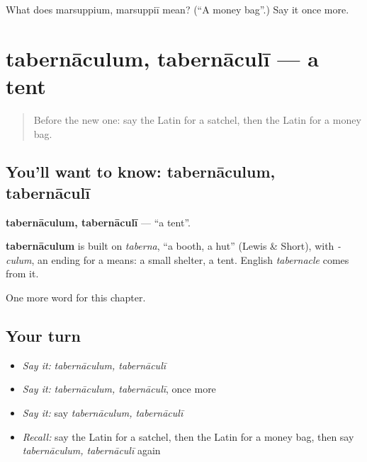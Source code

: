 \begin{tcolorbox}[breakable,colback=teal!4,colframe=teal!35!black,title={Before you move on}]
What does marsuppium, marsuppiī mean? (\textquotedblleft{}A money bag\textquotedblright{}.) Say it once more.
\end{tcolorbox}
\section[tabernāculum, tabernāculī]{tabernāculum, tabernāculī — a tent}

\label{lesson:LA-C254-tabernaculum}



\begin{quote}
Before the new one: say the Latin for a satchel, then the Latin for a money bag.
\end{quote}

\subsection*{You'll want to know: tabernāculum, tabernāculī}
\textbf{tabernāculum, tabernāculī} — \textquotedblleft{}a tent\textquotedblright{}.

\begin{cousinweb}
\textbf{tabernāculum} is built on \emph{taberna}, \textquotedblleft{}a booth, a hut\textquotedblright{} (Lewis \& Short), with \emph{-culum}, an ending for a means: a small shelter, a tent. English \emph{tabernacle} comes from it.
\end{cousinweb}

\begin{grammarlens}[title={What you've built}]
One more word for this chapter.
\end{grammarlens}

\subsection*{Your turn}
\begin{itemize}
\raggedright
  \item \emph{Say it:} \emph{tabernāculum, tabernāculī}
  \item \emph{Say it:} \emph{tabernāculum, tabernāculī}, once more
  \item \emph{Say it:} say \emph{tabernāculum, tabernāculī}
  \item \emph{Recall:} say the Latin for a satchel, then the Latin for a money bag, then say \emph{tabernāculum, tabernāculī} again
\end{itemize}

